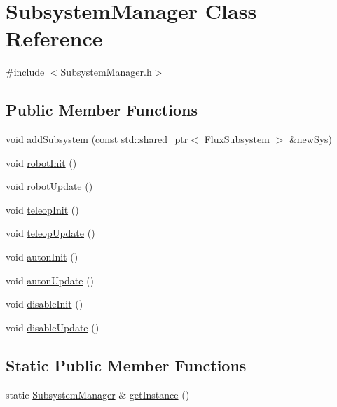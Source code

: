 \hypertarget{classSubsystemManager}{}\section{Subsystem\+Manager Class Reference}
\label{classSubsystemManager}


{\ttfamily \#include $<$Subsystem\+Manager.\+h$>$}

\subsection*{Public Member Functions}
\begin{DoxyCompactItemize}
\item 
void \hyperlink{classSubsystemManager_ae3910a93d2d417e07013d4b396d3a78b}{add\+Subsystem} (const std\+::shared\+\_\+ptr$<$ \hyperlink{classFluxSubsystem}{Flux\+Subsystem} $>$ \&new\+Sys)
\item 
void \hyperlink{classSubsystemManager_a5007405566ad61ec3a4198d81eb6edf0}{robot\+Init} ()
\item 
void \hyperlink{classSubsystemManager_a57f64def0b021ce8901cf1dfe1046256}{robot\+Update} ()
\item 
void \hyperlink{classSubsystemManager_a78e19880c05e4e2219bb5b8cf40607da}{teleop\+Init} ()
\item 
void \hyperlink{classSubsystemManager_ac55642f09846465e4482af14d835d98e}{teleop\+Update} ()
\item 
void \hyperlink{classSubsystemManager_a41232e2fb8956d8321522a23a1f63491}{auton\+Init} ()
\item 
void \hyperlink{classSubsystemManager_aa5bfa5743a4b8fdb8a6d83208b2f95dd}{auton\+Update} ()
\item 
void \hyperlink{classSubsystemManager_ac8f796d38c36f76798e992d1b1e3baef}{disable\+Init} ()
\item 
void \hyperlink{classSubsystemManager_a1c7c92c55c60928d08eec651074e74e2}{disable\+Update} ()
\end{DoxyCompactItemize}
\subsection*{Static Public Member Functions}
\begin{DoxyCompactItemize}
\item 
static \hyperlink{classSubsystemManager}{Subsystem\+Manager} \& \hyperlink{classSubsystemManager_a3acce674e15d2534ed8a0877b78ac64d}{get\+Instance} ()
\end{DoxyCompactItemize}


